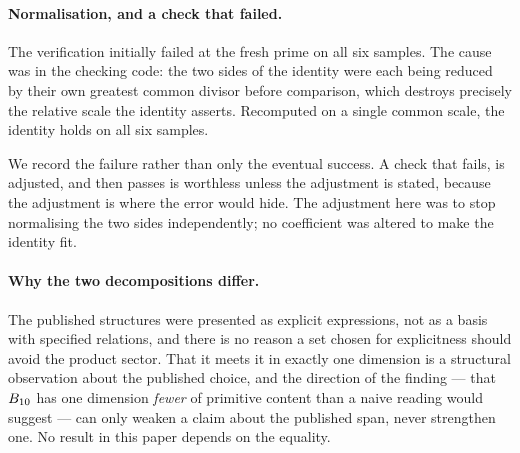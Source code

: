 \paragraph{Normalisation, and a check that failed.}
The verification initially failed at the fresh prime on all six samples. The
cause was in the checking code: the two sides of the identity were each being
reduced by their own greatest common divisor before comparison, which destroys
precisely the relative scale the identity asserts. Recomputed on a single common
scale, the identity holds on all six samples.

We record the failure rather than only the eventual success. A check that fails,
is adjusted, and then passes is worthless unless the adjustment is stated, because
the adjustment is where the error would hide. The adjustment here was to stop
normalising the two sides independently; no coefficient was altered to make the
identity fit.

\paragraph{Why the two decompositions differ.}
The published structures were presented as explicit expressions, not as a basis
with specified relations, and there is no reason a set chosen for explicitness
should avoid the product sector. That it meets it in exactly one dimension is a
structural observation about the published choice, and the direction of the
finding --- that $B_{10}$ has one dimension \emph{fewer} of primitive content than
a naive reading would suggest --- can only weaken a claim about the published
span, never strengthen one. No result in this paper depends on the equality.
